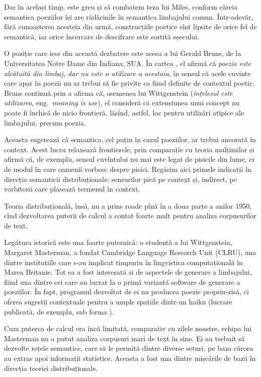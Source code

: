 Dar în același timp, este greu și să combatem teza lui Miles, conform căreia
semantica poeziilor își are rădăcinile în semantica limbajului comun. Într-adevăr,
fără cunoașterea acesteia din urmă, construcțiile poetice sînt lipsite de
orice fel de semantică, iar orice încercare de descifrare este sortită eșecului.

O poziție care iese din această dezbatere este aceea a lui Gerald Bruns,
de la Universitatea Notre Dame din Indiana, SUA. În cartea \cite{bruns},
el afirmă că \emph{poezia este alcătuită din limbaj, dar nu este o utilizare %
  a acestuia}, în sensul că acele cuvinte care apar în poezii nu ar trebui să
fie privite ca fiind definite de contextul poetic. Bruns continuă prin a afirma
că, asemenea lui Wittgenstein (\emph{înțelesul este utilizarea}, eng.\
\emph{meaning is use}), el consideră că extensiunea unui concept nu poate fi
închisă de nicio frontieră, lăsînd, astfel, loc pentru utilizări atipice ale
limbajului, precum poezia.

Aceasta sugerează că semantica, cel puțin în cazul poeziilor, ar trebui ancorată
în context. Acest lucru relaxează frontierele, prin comparație cu teoria
mulțimilor și afirmă că, de exemplu, sensul cuvîntului \qq{pisică} nu mai este
legat de pisicile din lume, ci de modul în care oamenii vorbesc despre pisici.
Regăsim aici primele indicații în direcția semanticii distribuționale:
\qq{responsabilitatea} sensurilor pică pe context și, indirect, pe vorbitorii care
plasează termenul în context.

Teoria distribuțională, însă, nu a prins roade pînă în a doua parte a anilor
1950, cînd dezvoltarea puterii de calcul a contat foarte mult pentru analiza
corpusurilor de text.

Legătura istorică este una foarte puternică: o studentă a lui Wittgenstein,
Margaret Masterman, a fondat Cambridge Language Research Unit (CLRU), una dintre
instituțiile care s-au implicat timpuriu în lingvistica computațională în Marea
Britanie. Tot ea a fost interesată si de aspectele de generare a limbajului, fiind
una dintre cei care au lucrat la o primă variantă software de generare a poeziilor.
În fapt, programul dezvoltat de ei nu producea poezie propriu-zisă, ci oferea
sugestii contextuale pentru a umple spațiile dintr-un haiku (lucrare publicată,
de exemplu, sub forma \cite{masterman}).

Cum puterea de calcul era încă limitată, comparativ cu zilele noastre, echipa
lui Masterman nu a putut analiza corpusuri mari de text în sine. Ei au trebuit
să dezvolte rețele semantice, care să le permită \qq{comunicarea} dintre
diverse seturi, pe baza cărora au extras apoi informații statistice.
Aceasta a fost una dintre mișcările de bază în direcția teoriei distribuționale.


